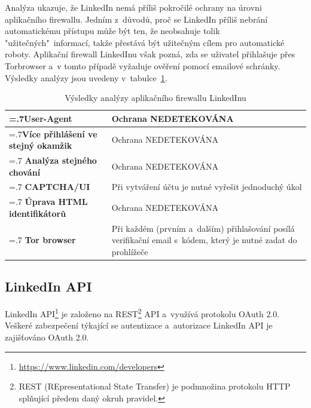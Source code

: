 Analýza ukazuje, že LinkedIn nemá příliš pokročilé ochrany na úrovni aplikačního firewallu. Jedním z~důvodů, proč se LinkedIn příliš nebrání automatickému přístupu může být ten, že neobsahuje tolik "užitečných"\ informací, takže přestává být užitečným cílem pro automatické roboty. Aplikační firewall LinkedInu však pozná, zda se uživatel přihlašuje přes Torbrowser a~v tomto případě vyžaduje ověření pomocí emailové schránky. Výsledky analýzy jsou uvedeny v~tabulce~\ref{tab:LinkedIn_analyse}.

\begin{table}[H]
\begin{tabularx}{\linewidth}{
    |>{\hsize=.7\hsize}X|>{\hsize=1.3\hsize}X|
  }
\hline

\textbf{User-Agent} & Ochrana NEDETEKOVÁNA \\
\hline
\textbf{Více přihlášení ve stejný okamžik} & Ochrana NEDETEKOVÁNA \\
\hline
\textbf{Analýza stejného chování} & Ochrana NEDETEKOVÁNA \\
\hline
\textbf{CAPTCHA/UI} & Při vytváření účtu je nutné vyřešit jednoduchý úkol \\
\hline
\textbf{Úprava HTML identifikátorů} & Ochrana NEDETEKOVÁNA \\
\hline
\textbf{Tor browser} & Při každém (prvním a~dalším) přihlašování posílá verifikační email s~kódem, který je nutné zadat do prohlížeče \\
\hline
\end{tabularx}

\label{tab:LinkedIn_analyse}
\caption{Výsledky analýzy aplikačního firewallu LinkedInu}
\end{table}

\subsection*{LinkedIn API}
LinkedIn API\footnote{\href{https://www.linkedin.com/developers}{https://www.linkedin.com/developers}} je založeno na REST\footnote{REST (REpresentational State Transfer) je podmnožina protokolu HTTP splňující předem daný okruh pravidel.} API a~využívá protokolu OAuth 2.0. Veškeré zabezpečení týkající se autentizace a~autorizace LinkedIn API je zajišťováno OAuth 2.0.

